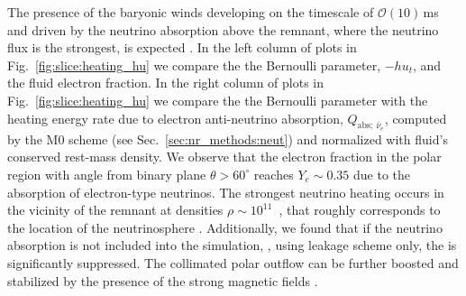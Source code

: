 The presence of the baryonic winds developing on the timescale of $\mathcal{O}(10)\,$ms
and driven by the neutrino absorption above the remnant, where the neutrino flux is the strongest, 
is expected \citep[\eg][]{Perego:2014fma}. 
%
In the left column of plots in Fig.~\ref{fig:slice:heating_hu} we compare 
the the Bernoulli parameter, $-hu_t$, 
and the fluid electron fraction. 
%
In the right column of plots in Fig.~\ref{fig:slice:heating_hu} we compare 
the the Bernoulli parameter with the heating energy rate due to electron anti-neutrino absorption, 
$Q_{\text{abs};\:\bar{\nu}_e}$, computed by the M0 scheme 
(see Sec.~\ref{sec:nr_methods:neut}) and 
normalized with fluid's conserved rest-mass density.
We observe that the electron fraction in the polar region with angle 
from binary plane $\theta>60^{\circ}$ reaches $Y_e\sim0.35$ due to the absorption of 
electron-type neutrinos.
The strongest neutrino heating occurs in the vicinity of the remnant at densities 
$\rho\sim10^{11}$~\gcm, that roughly corresponds
to the location of the neutrinosphere \citep{Endrizzi:2019trv}.
%
%
Additionally, we found that if the neutrino absorption is not included into the 
simulation, \eg, using leakage scheme only, the \nwind{} is significantly suppressed.  %
%
The collimated polar outflow can be further boosted and stabilized by the presence of the 
strong magnetic fields \citep{Bucciantini:2011kx,Ciolfi:2020hgg,Mosta:2020hlh}.

